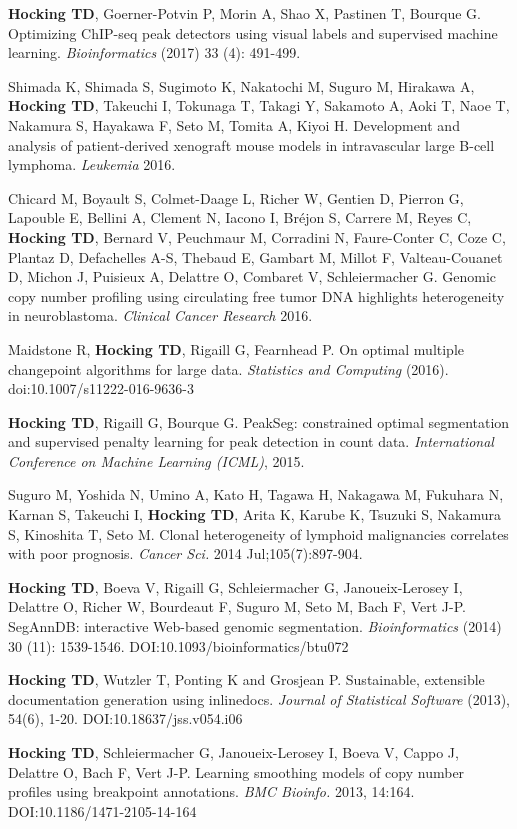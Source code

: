 \documentclass[margin,line]{res}
\begin{document}
\begin{resume}
{\bf Hocking TD}, Goerner-Potvin P, Morin A, Shao X, Pastinen T,
Bourque G. Optimizing ChIP-seq peak detectors using visual labels and
supervised machine learning. {\it Bioinformatics} (2017) 33 (4): 491-499.

Shimada K, Shimada S, Sugimoto K, Nakatochi M, Suguro M, Hirakawa A,
{\bf Hocking TD}, Takeuchi I, Tokunaga T, Takagi Y, Sakamoto A, Aoki T, Naoe
T, Nakamura S, Hayakawa F, Seto M, Tomita A, Kiyoi H. Development and
analysis of patient-derived xenograft mouse models in intravascular
large B-cell lymphoma. {\it Leukemia} 2016.

Chicard M, Boyault S, Colmet-Daage L, Richer W, Gentien D, Pierron G,
Lapouble E, Bellini A, Clement N, Iacono I, Bréjon S, Carrere M, Reyes
C, {\bf Hocking TD}, Bernard V, Peuchmaur M, Corradini N, Faure-Conter
C, Coze C, Plantaz D, Defachelles A-S, Thebaud E, Gambart M, Millot F,
Valteau-Couanet D, Michon J, Puisieux A, Delattre O, Combaret V,
Schleiermacher G. Genomic copy number profiling using circulating free
tumor DNA highlights heterogeneity in neuroblastoma. {\it Clinical Cancer
Research} 2016.

Maidstone R, {\bf Hocking TD}, Rigaill G, Fearnhead P. On optimal
multiple changepoint algorithms for large data. {\it Statistics and
Computing} (2016). doi:10.1007/s11222-016-9636-3 

{\bf Hocking TD}, Rigaill G, Bourque G. PeakSeg: constrained optimal
segmentation and supervised penalty learning for peak detection in
count data. {\it International Conference on Machine Learning (ICML)},
2015.

Suguro M, Yoshida N, Umino A, Kato H, Tagawa H, Nakagawa M, Fukuhara
N, Karnan S, Takeuchi I, {\bf Hocking TD}, Arita K, Karube K, Tsuzuki
S, Nakamura S, Kinoshita T, Seto M. Clonal heterogeneity of lymphoid
malignancies correlates with poor prognosis. {\it Cancer Sci.} 2014
Jul;105(7):897-904.

{\bf Hocking TD}, Boeva V, Rigaill G, Schleiermacher G,
Janoueix-Lerosey I, Delattre O, Richer W, Bourdeaut F, Suguro M, Seto
M, Bach F, Vert J-P. SegAnnDB: interactive Web-based genomic
segmentation. {\it Bioinformatics} (2014) 30 (11):
1539-1546. DOI:10.1093/bioinformatics/btu072

{\bf Hocking TD}, Wutzler T, Ponting K and Grosjean P. Sustainable,
extensible documentation generation using inlinedocs. {\it Journal of
Statistical Software} (2013), 54(6), 1-20. DOI:10.18637/jss.v054.i06

{\bf Hocking TD}, Schleiermacher G, Janoueix-Lerosey I, Boeva V, Cappo
J, Delattre O, Bach F, Vert J-P. Learning smoothing models of copy
number profiles using breakpoint annotations. {\it BMC Bioinfo.} 2013,
14:164. DOI:10.1186/1471-2105-14-164


\end{resume}
\end{document}
